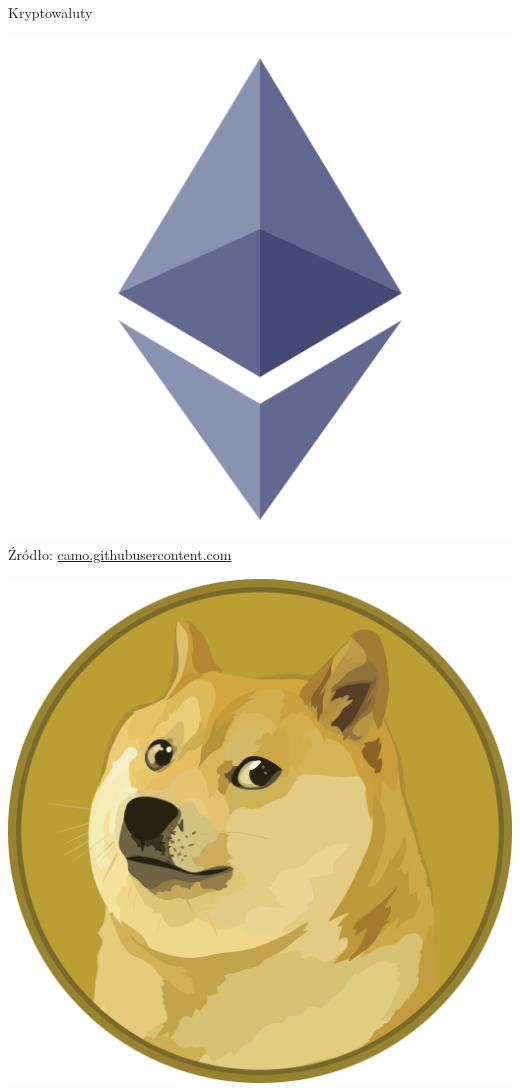 \begin{frame}{Kryptowaluty}
\begin{center}
\begin{minipage}{0.24\textwidth}
            \includegraphics[width=\linewidth]{applications/graphics/Ethereum.png} \\
            \tiny{Źródło: \href{https://camo.githubusercontent.com/1b3d0063d6a8bcd56ca07b0ea2ef0f71b17a0fa8/687474703a2f2f737667706f726e2e636f6d2f6c6f676f732f657468657265756d2e737667}{camo.githubusercontent.com}}
        \end{minipage}
        \hfill
        \begin{minipage}{0.24\textwidth}
            \centering
            \includegraphics[width=\linewidth]{applications/graphics/Dogecoin.png} \\

\end{minipage}
\end{center}
\end{frame}
